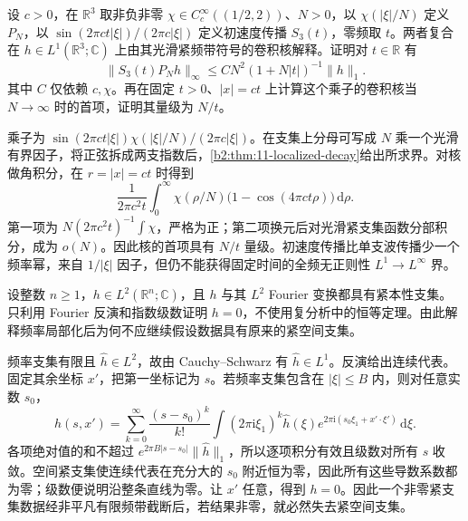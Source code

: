 \begin{optionalexercise}\label{b2:ex:11-velocity-band-loss}
设 \(c>0\)，在 \(\mathbb R^3\) 取非负非零 \(\chi\in C_c^\infty((1/2,2))\)、\(N>0\)，以 \(\chi(|\xi|/N)\) 定义 \(P_N\)，以 \(\sin(2\pi ct|\xi|)/(2\pi c|\xi|)\) 定义初速度传播 \(S_3(t)\)，零频取 \(t\)。两者复合在 \(h\in L^1(\mathbb R^3;\mathbb C)\) 上由其光滑紧频带符号的卷积核解释。证明对 \(t\in\mathbb R\) 有
\[
 \|S_3(t)P_Nh\|_\infty\leq C N^2(1+N|t|)^{-1}\|h\|_1.
\]
其中 \(C\) 仅依赖 \(c,\chi\)。再在固定 \(t>0\)、\(|x|=ct\) 上计算这个乘子的卷积核当 \(N\to\infty\) 时的首项，证明其量级为 \(N/t\)。
\end{optionalexercise}
\begin{solution}
乘子为 \(\sin(2\pi ct|\xi|)\chi(|\xi|/N)/(2\pi c|\xi|)\)。在支集上分母可写成 \(N\) 乘一个光滑有界因子，将正弦拆成两支指数后，\cref{b2:thm:11-localized-decay}给出所求界。对核做角积分，在 \(r=|x|=ct\) 时得到
\[
 \dfrac1{2\pi c^2t}\int_0^\infty
 \chi(\rho/N)\bigl(1-\cos(4\pi ct\rho)\bigr)\,\mathrm{d}\rho.
\]
第一项为 \(N(2\pi c^2t)^{-1}\int\chi\)，严格为正；第二项换元后对光滑紧支集函数分部积分，成为 \(o(N)\)。因此核的首项具有 \(N/t\) 量级。初速度传播比单支波传播少一个频率幂，来自 \(1/|\xi|\) 因子，但仍不能获得固定时间的全频无正则性 \(L^1\to L^\infty\) 界。
\end{solution}

\begin{optionalexercise}\label{b2:ex:11-bandlimited-support}
设整数 \(n\geq1\)，\(h\in L^2(\mathbb R^n;\mathbb C)\)，且 \(h\) 与其 \(L^2\) Fourier 变换都具有紧本性支集。只利用 Fourier 反演和指数级数证明 \(h=0\)，不使用复分析中的恒等定理。由此解释频率局部化后为何不应继续假设数据具有原来的紧空间支集。
\end{optionalexercise}
\begin{solution}
频率支集有限且 \(\widehat h\in L^2\)，故由 Cauchy--Schwarz 有 \(\widehat h\in L^1\)。反演给出连续代表。固定其余坐标 \(x'\)，把第一坐标记为 \(s\)。若频率支集包含在 \(|\xi|\leq B\) 内，则对任意实数 \(s_0\)，
\[
 h(s,x')=\sum_{k=0}^\infty\dfrac{(s-s_0)^k}{k!}
 \int(2\pi\mathrm{i}\xi_1)^k\widehat h(\xi)
       e^{2\pi\mathrm{i}(s_0\xi_1+x'\cdot\xi')}\,\mathrm{d}\xi.
\]
各项绝对值的和不超过 \(e^{2\pi B|s-s_0|}\|\widehat h\|_1\)，所以逐项积分有效且级数对所有 \(s\) 收敛。空间紧支集使连续代表在充分大的 \(s_0\) 附近恒为零，因此所有这些导数系数都为零；级数便说明沿整条直线为零。让 \(x'\) 任意，得到 \(h=0\)。因此一个非零紧支集数据经非平凡有限频带截断后，若结果非零，就必然失去紧空间支集。
\end{solution}

